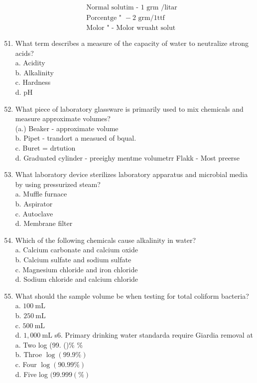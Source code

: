 \documentclass[10pt]{article}
\begin{document}
$$
\begin{aligned}
&\text { Normal solutim - } 1 \text { grm /litar } \\
&\text { Porcentge " }-2 \text { grm/1ttf } \\
&\text { Molor " - Molor wruaht solut }
\end{aligned}
$$

\begin{enumerate}
  \setcounter{enumi}{50}
  \item What term describes a measure of the capacity of water to neutralize strong acids?\\
a. Acidity\\
b. Alkalinity\\
c. Hardness\\
d. $\mathrm{pH}$

  \item What piece of laboratory glassware is primarily used to mix chemicals and measure approximate volumes?\\
(a.) Beaker - approximate volume\\
b. Pipet - trandort a measued of bqual.\\
c. Buret = drtution\\
d. Graduated cylinder - preeighy mentme volumetrr Flakk - Most preerse

  \item What laboratory device sterilizes laboratory apparatus and microbial media by using pressurized steam?\\
a. Muffle furnace\\
b. Aspirator\\
c. Autoclave\\
d. Membrane filter

  \item Which of the following chemicals cause alkalinity in water?\\
a. Calcium carbonate and calcium oxide\\
b. Calcium sulfate and sodium sulfate\\
c. Magnesium chloride and iron chloride\\
d. Sodium chloride and calcium chloride

  \item What should the sample volume be when testing for total coliform bacteria?\\
a. $100 \mathrm{~mL}$\\
b. $250 \mathrm{~mL}$\\
c. $500 \mathrm{~mL}$\\
d. $1,000 \mathrm{~mL}$ s6. Primary drinking water standarda require Giardia removal at\\
a. Two log (99. ()\% $\%$\\
b. Throe $\log (99.9 \%)$\\
c. Four $\log (90.99 \%)$\\
d. Five log $(99.999(\%)$

\end{enumerate}
\end{document}
